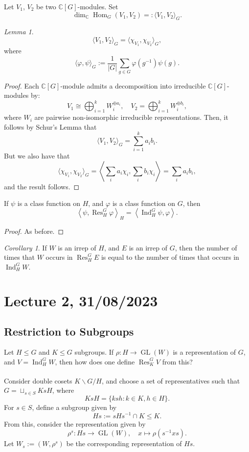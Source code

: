 \documentclass[a4paper]{report}
\theoremstyle{definition}
\theoremstyle{remark}
\theoremstyle{proposition}
\theoremstyle{conjecture}
\theoremstyle{lemma}
\newtheorem{lemma}{Lemma}
\theoremstyle{corollary}
\newtheorem{corollary}{Corollary}
\theoremstyle{exercise}
\theoremstyle{example}
\newcommand{\C}{\mathbb{C}}
\newcommand{\on}{\operatorname}
\begin{document}
Let $V_1$, $V_2$ be two $\C[G]$-modules. Set $$\dim_\C \on{Hom}_G(V_1,V_2) =: \langle V_1,V_2\rangle_G.$$

\begin{lemma}
    $$\langle V_1,V_2\rangle_G = \langle \chi_{V_1},\chi_{V_2}\rangle_G,$$
    where $$\langle \varphi,\psi\rangle_G := \frac{1}{\vert G\vert} \sum_{g\in G} \varphi(g^{-1})\psi(g).$$
\end{lemma}

\begin{proof}
    Each $\C[G]$-module admits a decomposition into irreducible 
    $\C[G]$-modules by:
    $$V_1 \cong \bigoplus_{i=1}^k W_i^{\oplus a_i}, \quad V_2 =\bigoplus_{i=1}^k W_i^{\oplus b_i},$$
    where $W_i$ are pairwise non-isomorphic irreducible representations.
    Then, it follows by Schur's Lemma that 
    $$\langle V_1,V_2\rangle_G = \sum_{i=1}^k a_ib_i.$$
    But we also have that 
    $$\langle \chi_{V_1},\chi_{V_2}\rangle_G = \left\langle \sum_i a_i\chi_i,\sum_ib_i\chi_i\right\rangle = \sum_ia_ib_i,$$
    and the result follows.
\end{proof}

\begin{theorem}\label{thm_frob_reciprocity}
    If $\psi$ is a class function on $H$, and $\varphi$ is a 
    class function on $G$, then 
    $$\left\langle \psi, \on{Res}_H^G\varphi\right\rangle_H = \left\langle \on{Ind}_H^G \psi,\varphi\right\rangle.$$
\end{theorem}

\begin{proof}
    As before.
\end{proof}

\begin{corollary}
    If $W$ is an irrep of $H$, and $E$ is an irrep of $G$,
    then the number of times that $W$ occurs in 
    $\on{Res}_H^G E$ is equal to the number of times that 
    occurs in $\on{Ind}_H^GW$.
\end{corollary}

\section{Lecture 2, 31/08/2023}

\subsection{Restriction to Subgroups}

Let $H\leq G$ and $K\leq G$ subgroups. 
If $\rho : H \to \on{GL}(W)$ is a representation of $G$,
and $V = \on{Ind}_H^G W$, then how does one define $\on{Res}^G_KV$ 
from this?\\\\
Consider double cosets $K\backslash G / H$, and choose a set of representatives
such that $G = \sqcup_{s \in S} KsH$, where 
$$KsH = \lbrace ksh : k\in K, h\in H\rbrace.$$
For $s\in S$, define a subgroup given by $$Hs := sHs^{-1}\cap K \leq K.$$
From this, consider the representation given by 
$$\rho^s : Hs \longrightarrow \on{GL}(W), \quad x\longmapsto \rho(s^{-1}xs).$$
Let $W_s := (W,\rho^s)$ be the corresponding representation of $Hs$.
\end{document}
